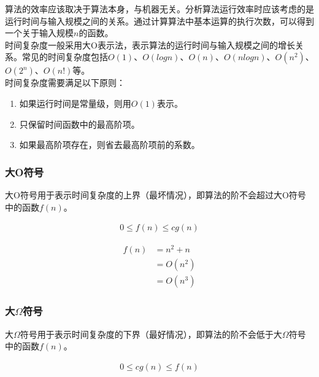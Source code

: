算法的效率应该取决于算法本身，与机器无关。分析算法运行效率时应该考虑的是运行时间与输入规模之间的关系。通过计算算法中基本运算的执行次数，可以得到一个关于输入规模$ n $的函数。\\

时间复杂度一般采用大O表示法，表示算法的运行时间与输入规模之间的增长关系。常见的时间复杂度包括$ O(1) $、$ O(logn) $、$ O(n) $、$ O(nlogn) $、$ O(n^2) $、$ O(2^n) $、$ O(n!) $等。\\

时间复杂度需要满足以下原则：

\begin{enumerate}
	\item 如果运行时间是常量级，则用$ O(1) $表示。
	\item 只保留时间函数中的最高阶项。
	\item 如果最高阶项存在，则省去最高阶项前的系数。
\end{enumerate}

\vspace{0.5cm}

\subsubsection{大O符号}

大O符号用于表示时间复杂度的上界（最坏情况），即算法的阶不会超过大O符号中的函数$ f(n) $。

\vspace{-0.5cm}

\begin{align}
	0 \le f(n) \le cg(n)
\end{align}

\vspace{-1cm}

\begin{align*}
	f(n) & = n^2 + n \\
	     & = O(n^2)  \\
	     & = O(n^3)
\end{align*}

\subsubsection{大$ \Omega $符号}

大$ \Omega $符号用于表示时间复杂度的下界（最好情况），即算法的阶不会低于大$ \Omega $符号中的函数$ f(n) $。

\vspace{-0.5cm}

\begin{align}
	0 \le cg(n) \le f(n)
\end{align}

